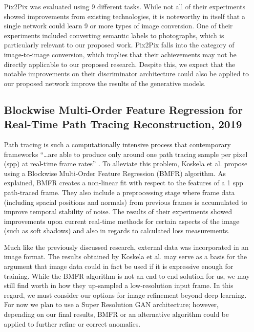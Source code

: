 \documentclass{article}
\begin{document}
Pix2Pix was evaluated using 9 different tasks. While not all of their
experiments showed improvements from existing technologies, it is noteworthy
in itself that a single network could learn 9 or more types of image conversion.
One of their experiments included converting semantic labels to photographs,
which is particularly relevant to our proposed work.
Pix2Pix falls into the category of image-to-image conversion, which implies that
their achievements may not be directly applicable to our proposed research.
Despite this, we expect that the notable improvements on their discriminator 
architecture could also be applied to our proposed network improve the results
of the generative models.

\subsection*{Blockwise Multi-Order Feature Regression for Real-Time Path Tracing Reconstruction, 2019}
\nocite{path_tracing}
Path tracing is such a computationally intensive process that contemporary
frameworks
``\dots are able to produce only around one path tracing sample per pixel (spp)
at real-time frame rates'' \cite{path_tracing}.
To alleviate this problem, Koskela et al. propose using a
Blockwise Multi-Order Feature Regression (BMFR) algorithm.
As explained, BMFR creates a non-linear fit with respect to the
features of a 1 spp path-traced
frame. They also include a preprocessing stage where frame data (including
spacial positions and normals) from previous frames is accumulated to improve
temporal stability of noise. The results of their experiments showed
improvements upon current real-time methods for certain aspects of the image
(such as soft shadows) and also in regards to calculated loss measurements.

Much like the previously discussed research, external data was incorporated
in an image format. The results obtained by Koskela et al. may serve as a basis
for the argument that image data could in fact be used if it is expressive enough
for training.
While the BMFR algorithm is not an end-to-end solution for us, we may still find
worth in how they up-sampled a low-resolution input frame. In this regard,
we must consider our options for image refinement beyond deep learning.
For now we plan to use a Super Resolution GAN architecture; however, depending on
our final results, BMFR or an alternative algorithm could be
applied to further refine or correct anomalies.
\end{document}

